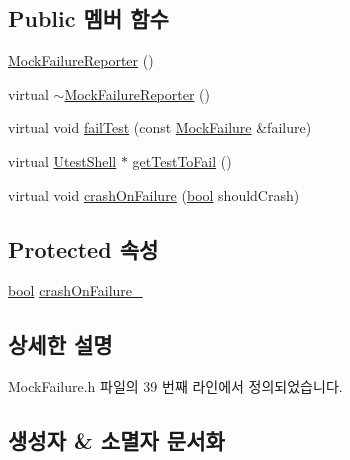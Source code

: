 \subsection*{Public 멤버 함수}
\begin{DoxyCompactItemize}
\item 
\hyperlink{class_mock_failure_reporter_ac8ba580631c4ff8ee1e6f719012f26b7}{Mock\+Failure\+Reporter} ()
\item 
virtual \hyperlink{class_mock_failure_reporter_a03dc9b72ef73ce72b763c30a26c6342b}{$\sim$\+Mock\+Failure\+Reporter} ()
\item 
virtual void \hyperlink{class_mock_failure_reporter_a275e824525aa26cb8874437442cdc186}{fail\+Test} (const \hyperlink{class_mock_failure}{Mock\+Failure} \&failure)
\item 
virtual \hyperlink{class_utest_shell}{Utest\+Shell} $\ast$ \hyperlink{class_mock_failure_reporter_ae3f75fac53b4d3395e02ee8eca858422}{get\+Test\+To\+Fail} ()
\item 
virtual void \hyperlink{class_mock_failure_reporter_aaeded55857f443ab119b74f1fda402aa}{crash\+On\+Failure} (\hyperlink{avb__gptp_8h_af6a258d8f3ee5206d682d799316314b1}{bool} should\+Crash)
\end{DoxyCompactItemize}
\subsection*{Protected 속성}
\begin{DoxyCompactItemize}
\item 
\hyperlink{avb__gptp_8h_af6a258d8f3ee5206d682d799316314b1}{bool} \hyperlink{class_mock_failure_reporter_a9faf961cbe6687577f4eaae4625bcbea}{crash\+On\+Failure\+\_\+}
\end{DoxyCompactItemize}


\subsection{상세한 설명}


Mock\+Failure.\+h 파일의 39 번째 라인에서 정의되었습니다.



\subsection{생성자 \& 소멸자 문서화}
